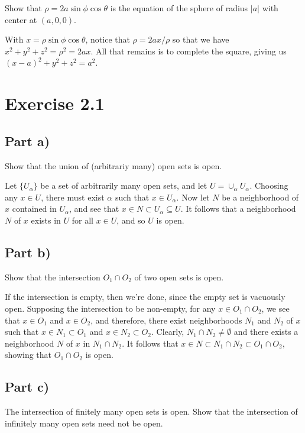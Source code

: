 \documentclass[12pt]{article}
\begin{document}
Show that $\rho=2a\sin\phi\cos\theta$ is the equation of the sphere of
radius $|a|$ with center at $(a,0,0)$.

With $x=\rho\sin\phi\cos\theta$, notice that $\rho=2ax/\rho$ so that
we have $x^2+y^2+z^2=\rho^2=2ax$.  All that remains is to
complete the square, giving us $(x-a)^2+y^2+z^2=a^2$.

\section*{Exercise 2.1}

\subsection*{Part a)}

Show that the union of (arbitrariy many) open sets is open.

Let $\{U_\alpha\}$ be a set of arbitrarily many open sets, and
let $U=\cup_\alpha U_\alpha$.  Choosing any $x\in U$, there
must exist $\alpha$ such that $x\in U_\alpha$.  Now let $N$ be
a neighborhood of $x$ contained in $U_\alpha$, and see that
$x\in N\subset U_\alpha\subseteq U$.  It follows that a neighborhood
$N$ of $x$ exists in $U$ for all $x\in U$, and so $U$ is open.

\subsection*{Part b)}

Show that the intersection $O_1\cap O_2$ of two open sets is open.

If the intersection is empty, then we're done, since the empty set is vacuously open.
Supposing the intersection to be non-empty, for any $x\in O_1\cap O_2$, we see
that $x\in O_1$ and $x\in O_2$, and therefore, there exist neighborhoods $N_1$ and
$N_2$ of $x$ such that $x\in N_1\subset O_1$ and $x\in N_2\subset O_2$.  Clearly,
$N_1\cap N_2\neq\emptyset$ and there exists a neighborhood $N$ of $x$ in $N_1\cap N_2$.
It follows that $x\in N\subset N_1\cap N_2\subset O_1\cap O_2$, showing that $O_1\cap O_2$ is open.

\subsection*{Part c)}

The intersection of finitely many open sets is open.  Show that the intersection
of infinitely many open sets need not be open.
\end{document}
